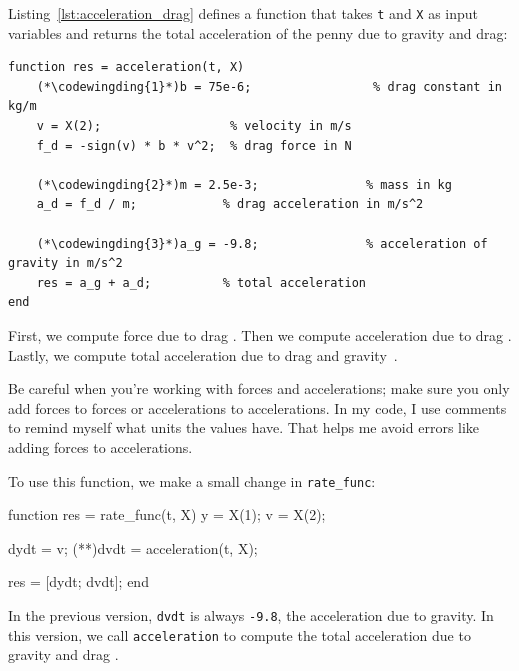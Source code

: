 Listing~\ref{lst:acceleration_drag} defines a function that takes \lstinline{t} and \lstinline{X} as input variables and returns the total acceleration of the penny due to gravity and drag:

\begin{lstlisting}[caption={Calculating acceleration of a penny with drag}, label={lst:acceleration_drag}]
function res = acceleration(t, X)
    (*\codewingding{1}*)b = 75e-6;                 % drag constant in kg/m
    v = X(2);                  % velocity in m/s
    f_d = -sign(v) * b * v^2;  % drag force in N

    (*\codewingding{2}*)m = 2.5e-3;               % mass in kg
    a_d = f_d / m;            % drag acceleration in m/s^2

    (*\codewingding{3}*)a_g = -9.8;               % acceleration of gravity in m/s^2
    res = a_g + a_d;          % total acceleration
end
\end{lstlisting}

First, we compute force due to drag .
Then we compute acceleration due to drag .
Lastly, we compute total acceleration due to drag and \mbox{gravity~}.


Be careful when you're working with forces and accelerations; make sure
you only add forces to forces or accelerations to accelerations.  In my
code, I use comments to remind myself what units the values have.
That helps me avoid errors like adding forces to accelerations.

To use this function, we make a small change in \lstinline{rate_func}:

\begin{code}
function res = rate_func(t, X)
    y = X(1);      
    v = X(2);      
    
    dydt = v;
    (**)dvdt = acceleration(t, X);   %

    res = [dydt; dvdt];
end

\end{code}

In the previous version, \lstinline{dvdt} is always \lstinline{-9.8}, the acceleration due to gravity.
In this version, we call \lstinline{acceleration} to compute the total acceleration due to gravity and drag .

